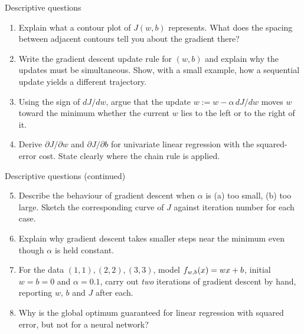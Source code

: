 \documentclass[aspectratio=169,10pt]{beamer}
\begin{document}
\begin{frame}{Descriptive questions}
  \small
  \begin{enumerate}
    \item Explain what a contour plot of $J(w,b)$ represents. What does the
          spacing between adjacent contours tell you about the gradient there?
          \hfill{}
    \item Write the gradient descent update rule for $(w,b)$ and explain why the
          updates must be simultaneous. Show, with a small example, how a
          sequential update yields a different trajectory. \hfill{}
    \item Using the sign of $dJ/dw$, argue that the update
          $w := w-\alpha\,dJ/dw$ moves $w$ toward the minimum whether the current
          $w$ lies to the left or to the right of it. \hfill{}
    \item Derive $\partial J/\partial w$ and $\partial J/\partial b$ for
          univariate linear regression with the squared-error cost. State clearly
          where the chain rule is applied. \hfill{}
  \end{enumerate}
\end{frame}

\begin{frame}{Descriptive questions (continued)}
  \small
  \begin{enumerate}\setcounter{enumi}{4}
    \item Describe the behaviour of gradient descent when $\alpha$ is (a) too
          small, (b) too large. Sketch the corresponding curve of $J$ against
          iteration number for each case. \hfill{}
    \item Explain why gradient descent takes smaller steps near the minimum even
          though $\alpha$ is held constant. \hfill{}
    \item For the data $(1,1),(2,2),(3,3)$, model $f_{w,b}(x)=wx+b$, initial
          $w=b=0$ and $\alpha=0.1$, carry out \emph{two} iterations of gradient
          descent by hand, reporting $w$, $b$ and $J$ after each. \hfill{}
    \item Why is the global optimum guaranteed for linear regression with squared
          error, but not for a neural network? \hfill{}
  \end{enumerate}
\end{frame}
\end{document}
